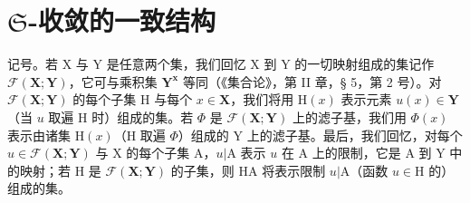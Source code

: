 \section{\texorpdfstring{\(\mathfrak{S}\)-收敛的一致结构}{S-收敛的一致结构}}

记号。若 X 与 Y 是任意两个集，我们回忆 X 到 Y 的一切映射组成的集记作 \(\mathcal{F}(\mathbf{X};\mathbf{Y})\)，它可与乘积集 \(\mathbf{Y}^{\mathbf{x}}\) 等同（《集合论》，第 II 章，§ 5，第 2 号）。对 \(\mathcal{F}(\mathbf{X};\mathbf{Y})\) 的每个子集 H 与每个 \(x\in \mathbf{X}\)，我们将用 \(\mathrm{H}(x)\) 表示元素 \(u(x)\in \mathbf{Y}\)（当 \(u\) 取遍 H 时）组成的集。若 \(\Phi\) 是 \(\mathcal{F}(\mathbf{X};\mathbf{Y})\) 上的滤子基，我们用 \(\Phi (x)\) 表示由诸集 \(\mathrm{H}(x)\)（H 取遍 \(\Phi\)）组成的 Y 上的滤子基。最后，我们回忆，对每个 \(u\in \mathcal{F}(\mathbf{X};\mathbf{Y})\) 与 X 的每个子集 A，\(u|\mathrm{A}\) 表示 \(u\) 在 A 上的限制，它是 A 到 Y 中的映射；若 H 是 \(\mathcal{F}(\mathbf{X};\mathbf{Y})\) 的子集，则 H\textbar A 将表示限制 \(u|\mathrm{A}\)（函数 \(u\in \mathrm{H}\) 的）组成的集。

